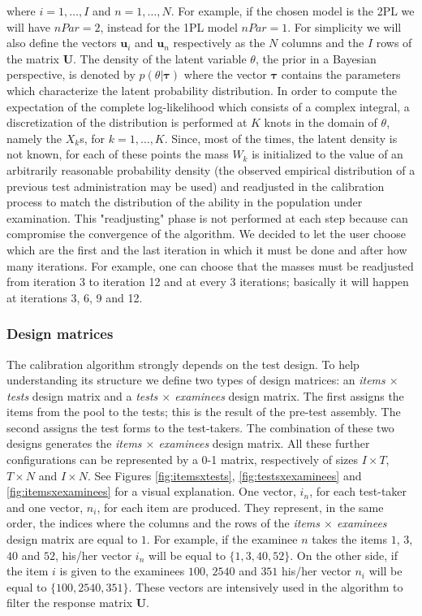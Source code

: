 \noindent where $i=1,\ldots,I$ and $n=1,\ldots,N$. For example, if the chosen model is the 2PL we will have $nPar=2$, instead for the 1PL model $nPar=1$.
For simplicity we will also define the vectors $\mathbf{u}_i$ and $\mathbf{u}_n$ respectively as the $N$ columns and the $I$ rows of the matrix $\mathbf{U}$. 
The density of the latent variable $\theta$, the prior in a Bayesian perspective, is denoted by $p(\theta|\boldsymbol{\tau})$ where the vector $\boldsymbol{\tau}$ contains the parameters which characterize the latent probability distribution. In order to compute the expectation of the complete log-likelihood which consists of a complex integral, a discretization of the distribution is performed at $K$ knots in the domain of $\theta$, namely the $X_k$s, for $k=1,\ldots,K$. Since, most of the times, the latent density is not known, for each of these points the mass $W_k$ is initialized to the value of an arbitrarily reasonable probability density (the observed empirical distribution of a previous test administration may be used) and readjusted in the calibration process to match the distribution of the ability in the population under examination. This "readjusting" phase is not performed at each step because can compromise the convergence of the algorithm. We decided to let the user choose which are the first and the last iteration in which it must be done and after how many iterations. For example, one can choose that the masses must be readjusted from iteration 3 to iteration 12 and at every 3 iterations; basically it will happen at iterations 3, 6, 9 and 12.

\subsubsection{Design matrices}

The calibration algorithm strongly depends on the test design. To help understanding its structure we define two types of design matrices: an \emph{items $\times$ tests} design matrix and a \emph{tests $\times$ examinees} design matrix. The first assigns the items from the pool to the tests; this is the result of the pre-test assembly. The second assigns the test forms to the test-takers. The combination of these two designs generates the \emph{items $\times$ examinees} design matrix. All these further configurations can be represented by a 0-1 matrix, respectively of sizes $I \times T$, $T\times N$ and $I \times N$. See Figures \ref{fig:itemsxtests}, \ref{fig:testsxexaminees} and \ref{fig:itemsxexaminees} for a visual explanation. One vector, $i_n$, for each test-taker and one vector, $n_i$, for each item are produced. They represent, in the same order, the indices where the columns and the rows of the \emph{items $\times$ examinees} design matrix are equal to $1$. For example, if the examinee $n$ takes the items $1$, $3$, $40$ and $52$, his/her vector $i_n$ will be equal to $\{1,3,40,52\}$. On the other side, if the item $i$ is given to the examinees $100$, $2540$ and $351$ his/her vector $n_i$ will be equal to $\{100,2540, 351\}$. These vectors are intensively used in the algorithm to filter the response matrix $\mathbf{U}$. 

